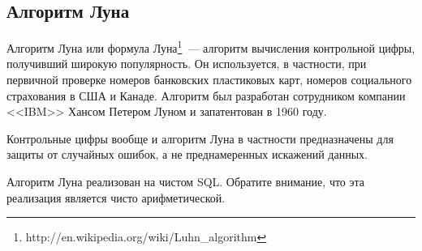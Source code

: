 \subsection{Алгоритм Луна}
Алгоритм Луна или формула Луна\footnote{http://en.wikipedia.org/wiki/Luhn\_algorithm}~--- алгоритм вычисления контрольной цифры, получивший широкую популярность. 
Он используется, в частности, при первичной проверке номеров банковских пластиковых карт, номеров социального 
страхования в США и Канаде. Алгоритм был разработан сотрудником компании <<IBM>> Хансом Петером Луном и 
запатентован в 1960 году.

Контрольные цифры вообще и алгоритм Луна в частности предназначены для защиты от случайных ошибок, 
а не преднамеренных искажений данных.

Алгоритм Луна реализован на чистом SQL. Обратите внимание, что эта реализация является чисто арифметической.

